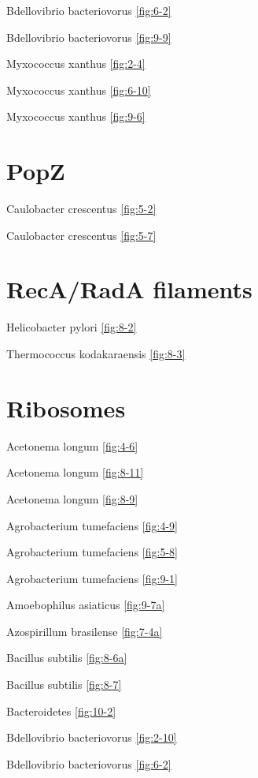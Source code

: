 \documentclass[]{tufte-book}
\begin{document}
Bdellovibrio bacteriovorus \ref{fig:6-2}

Bdellovibrio bacteriovorus \ref{fig:9-9}

Myxococcus xanthus \ref{fig:2-4}

Myxococcus xanthus \ref{fig:6-10}

Myxococcus xanthus \ref{fig:9-6}

\hypertarget{popz}{%
\section*{PopZ}\label{popz}}

Caulobacter crescentus \ref{fig:5-2}

Caulobacter crescentus \ref{fig:5-7}

\hypertarget{recarada-filaments}{%
\section*{RecA/RadA filaments}\label{recarada-filaments}}

Helicobacter pylori \ref{fig:8-2}

Thermococcus kodakaraensis \ref{fig:8-3}

\hypertarget{ribosomes}{%
\section*{Ribosomes}\label{ribosomes}}

Acetonema longum \ref{fig:4-6}

Acetonema longum \ref{fig:8-11}

Acetonema longum \ref{fig:8-9}

Agrobacterium tumefaciens \ref{fig:4-9}

Agrobacterium tumefaciens \ref{fig:5-8}

Agrobacterium tumefaciens \ref{fig:9-1}

Amoebophilus asiaticus \ref{fig:9-7a}

Azospirillum brasilense \ref{fig:7-4a}

Bacillus subtilis \ref{fig:8-6a}

Bacillus subtilis \ref{fig:8-7}

Bacteroidetes \ref{fig:10-2}

Bdellovibrio bacteriovorus \ref{fig:2-10}

Bdellovibrio bacteriovorus \ref{fig:6-2}
\end{document}
